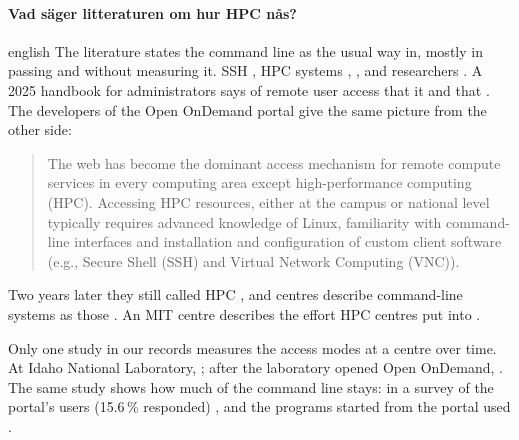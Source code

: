 \paragraph{%
  {Vad säger litteraturen om hur HPC nås?}} %
\begin{onlyin}{english} %
The literature states the command line as the usual way in, mostly in
passing and without measuring it.  SSH ,
HPC systems ,
, and researchers
.  A 2025 handbook for
administrators says of remote user access that it
 and that .  The developers of the Open OnDemand portal give
the same picture from the other side: \blockcquote[1]{Hudak2018OnDemand}{The
web has become the dominant access mechanism for remote compute services
in every computing area except high-performance computing (HPC).
Accessing HPC resources, either at the campus or national level typically
requires advanced knowledge of Linux, familiarity with command-line
interfaces and installation and configuration of custom client software
(e.g., Secure Shell (SSH) and Virtual Network Computing (VNC)).}  Two
years later they still called HPC , and centres describe command-line systems as those
.  An MIT centre
describes the effort HPC centres put into
.

Only one study in our records measures the access modes at a centre over
time.  At Idaho National Laboratory,
; after the laboratory opened Open
OnDemand, .
The same study shows how much of the command line stays: in a survey of
the portal's users (15.6\,\% responded)
, and the programs started
from the portal used .
\end{onlyin}
